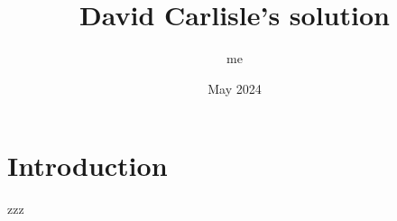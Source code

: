 \documentclass{article}
\title{David Carlisle's solution}
\author{me}
\date{May 2024}
\begin{document}
\maketitle
\section{Introduction}
zzz
\end{document}
